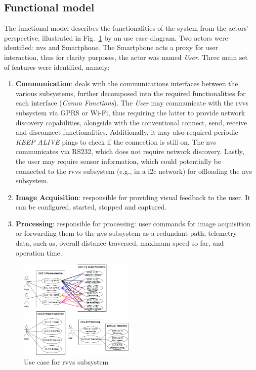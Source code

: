\subsection{Functional model}%
\label{sec:functional-model-rvvs}
The functional model describes the functionalities of the system from the
actors' perspective, illustrated in Fig.~\ref{fig:rvvs-use-cases-diag} by an use
case diagram. Two actors were identified: \gls{nvs} and Smartphone. The
Smartphone acts a proxy for user interaction, thus for clarity purposes, the
actor was named \emph{User}. Three main set of features were identified, namely:
\begin{enumerate}
\item \textbf{Communication}: deals with the communications interfaces between the
  various subsystems, further decomposed into the required functionalities for
  each interface (\emph{Comm Functions}). The \emph{User} may communicate with
  the \gls{rvvs} subsystem via GPRS or Wi-Fi, thus requiring the latter to
  provide network discovery capabilities, alongside with the conventional
  connect, send, receive and  disconnect functionalities. Additionally, it may
  also required periodic \textit{KEEP ALIVE} pings to check if the connection is
  still on. The \acrshort{nvs} communicates via RS232, which does not require
  network discovery. Lastly, the user may require sensor information, which
  could potentially be connected to the \gls{rvvs} subsystem (e.g., in a
  \gls{i2c} network) for offloading the \gls{nvs} subsystem.
\item \textbf{Image Acquisition}: responsible for providing visual feedback
  to the user. It can be configured, started, stopped and captured.
\item \textbf{Processing}: responsible for processing: user commands for image
  acquisition or forwarding them to the \gls{nvs} subsystem as a redundant path;
  telemetry data, such as, overall distance traversed, maximum speed so far,
  and operation time.
\end{enumerate}
\begin{figure}[!hbt]
\centering
    \includegraphics[width=0.5\textwidth]{./img/rvvs-use-cases-diag.png}
  \caption{Use case for \acrshort{rvvs} subsystem}%
\label{fig:rvvs-use-cases-diag}
\end{figure}
